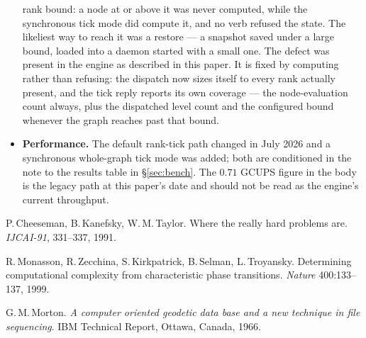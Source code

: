 \documentclass[11pt]{article}
\begin{document}
\begin{itemize}[label={--},leftmargin=1.6em]
        rank bound: a node at or above it was never computed, while
        the synchronous tick mode did compute it, and no verb refused
        the state. The likeliest way to reach it was a restore --- a
        snapshot saved under a large bound, loaded into a daemon
        started with a small one. The defect was present in the engine
        as described in this paper. It is fixed by computing rather
        than refusing: the dispatch now sizes itself to every rank
        actually present, and the tick reply reports its own coverage
        --- the node-evaluation count always, plus the dispatched
        level count and the configured bound whenever the graph
        reaches past that bound.
  \item \textbf{Performance.} The default rank-tick path changed in
        July 2026 and a synchronous whole-graph tick mode was added;
        both are conditioned in the note to the results table in
        \S\ref{sec:bench}. The $0.71$ GCUPS figure in the body is the
        legacy path at this paper's date and should not be read as the
        engine's current throughput.
\end{itemize}

\begin{thebibliography}{9}
P.\,Cheeseman, B.\,Kanefsky, W.\,M.\,Taylor. Where the really hard
problems are. \emph{IJCAI-91}, 331--337, 1991.

R.\,Monasson, R.\,Zecchina, S.\,Kirkpatrick, B.\,Selman,
L.\,Troyansky. Determining computational complexity from
characteristic phase transitions. \emph{Nature} 400:133--137, 1999.

G.\,M.\,Morton. \emph{A computer oriented geodetic data base and
a new technique in file sequencing}. IBM Technical Report, Ottawa,
Canada, 1966.
\end{thebibliography}
\end{document}
